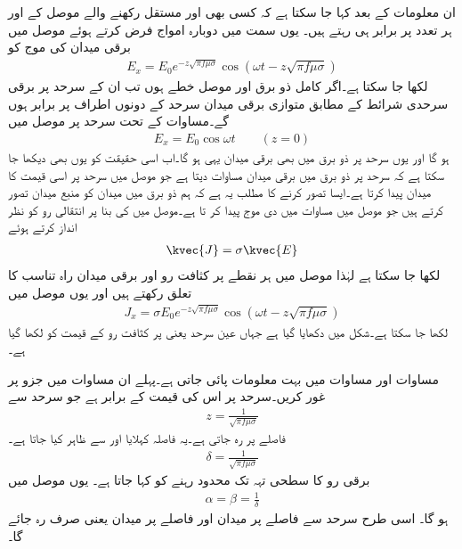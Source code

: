 ان معلومات کے بعد کہا جا سکتا ہے کہ کسی بھی اور  مستقل رکھنے والے موصل کے  اور  ہر تعدد پر برابر ہی رہتے ہیں۔ یوں  سمت میں دوبارہ امواج فرض کرتے ہوئے موصل میں برقی میدان کی موج کو
\begin{align}\label{مساوات_موج_موصل_موج}
E_x=E_0 e^{-z \sqrt{\pi f \mu \sigma}} \cos (\omega t - z \sqrt{\pi f \mu \sigma})
\end{align}
لکھا جا سکتا ہے۔اگر  کامل ذو برق اور  موصل خطے ہوں تب ان کے سرحد  پر برقی سرحدی شرائط کے مطابق متوازی برقی میدان سرحد کے دونوں اطراف پر برابر ہوں گے۔مساوات  کے تحت سرحد پر موصل میں
\begin{align}\label{مساوات_موج_موصل_ذو_برق_سرحد_موج}
E_x=E_0  \cos \omega t \quad  \quad (z=0)
\end{align}
ہو گا اور یوں سرحد پر ذو برق میں بھی برقی میدان یہی ہو گا۔اب اسی حقیقت کو یوں بھی دیکھا جا سکتا ہے کہ سرحد پر ذو برق میں برقی میدان مساوات  دیتا ہے جو موصل میں سرحد پر اسی قیمت کا میدان پیدا کرتا ہے۔ایسا تصور کرنے کا مطلب یہ ہے کہ ہم ذو برق میں میدان کو منبع میدان تصور کرتے ہیں جو موصل میں مساوات  میں دی موج پیدا کر تا ہے۔موصل میں  کی بنا پر انتقالی رو کو نظر انداز کرتے ہوئے
\begin{align}
\kvec{J}=\sigma \kvec{E}
\end{align}
لکھا جا سکتا ہے لہٰذا موصل میں ہر نقطے پر کثافت رو اور برقی میدان راہ تناسب کا تعلق رکھتے ہیں اور یوں موصل میں
\begin{align}\label{مساوات_موج_موصل_کثافت_رو_موج}
J_x=\sigma E_0 e^{-z \sqrt{\pi f \mu \sigma}} \cos (\omega t - z \sqrt{\pi f \mu \sigma})
\end{align}
لکھا جا سکتا ہے۔شکل  میں  دکھایا گیا ہے جہاں عین سرحد یعنی  پر کثافت رو کے قیمت  کو  لکھا گیا ہے۔

مساوات  اور مساوات  میں بہت معلومات پائی جاتی ہے۔پہلے ان مساوات میں
   جزو پر غور کریں۔سرحد پر اس کی قیمت  کے برابر ہے جو سرحد سے
\begin{align*}
z=\frac{1}{\sqrt{\pi f \mu \sigma}}
\end{align*}
فاصلے پر  رہ جاتی ہے۔یہ فاصلہ  کہلایا اور  سے ظاہر کیا جاتا ہے۔
\begin{align}\label{مساوات_موج_گہرائی_جلد_تعریف}
\delta =\frac{1}{\sqrt{\pi f \mu \sigma}}
\end{align}
برقی رو کا سطحی تہہ تک محدود رہنے کو  کہا جاتا ہے۔
یوں موصل میں
\begin{align}\label{مساوات_موج_گہرائی_جلد_کے_تعلق}
\alpha=\beta=\frac{1}{\delta}
\end{align}
ہو گا۔
اسی طرح سرحد سے  فاصلے پر میدان  اور   فاصلے پر میدان  یعنی صرف  رہ جائے گا۔

